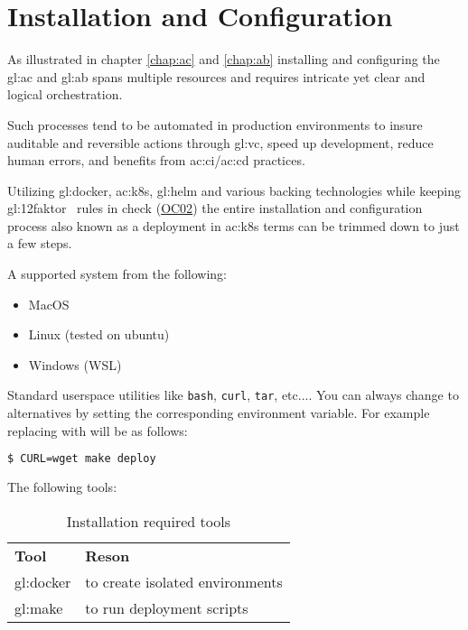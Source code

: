 %
\chapter{Installation and Configuration}

As illustrated in chapter \ref{chap:ac} and \ref{chap:ab} installing and configuring the \gls{gl:ac} and \gls{gl:ab} spans multiple resources and requires intricate yet clear and logical orchestration.

Such processes tend to be automated in production environments to insure auditable and reversible actions through \gls{gl:vc}, speed up development, reduce human errors, and benefits from \gls{ac:ci}/\gls{ac:cd} practices.

Utilizing \gls{gl:docker}, \gls{ac:k8s}, \gls{gl:helm} and various backing technologies while keeping \gls{gl:12faktor}~\citep{TheTwelv47} rules in check (\hyperref[oc:ac02]{OC02}) the entire installation and configuration process also known as a deployment in \gls{ac:k8s} terms can be trimmed down to just a few steps.


A supported system from the following:

\begin{itemize}
  \item MacOS
  \item Linux (tested on ubuntu)
  \item Windows (WSL)
\end{itemize}

Standard userspace utilities like \lstinline[columns=fixed]{bash}, \lstinline[columns=fixed]{curl}, \lstinline[columns=fixed]{tar}, etc.... You can always change to alternatives by setting the corresponding environment variable. For example replacing  with  will be as follows:

\begin{lstlisting}[language=bash, caption={Deploy with custom command}, label={sh:dwcc}]
    $ CURL=wget make deploy
\end{lstlisting}

The following tools:

\begin{table}[H]
  \begin{center}
    \label{tab:irt}
    \def\arraystretch{1.5}
    \begin{tabularx}{\linewidth}{|l X |}
      \hline
      \rowcolor{gray!20}
      \textbf{Tool} & \textbf{Reson}\\
      \gls{gl:docker} & to create isolated environments\\
      \gls{gl:make} & to run deployment scripts\\
      \hline
    \end{tabularx}
    \caption{Installation required tools}
  \end{center}
\end{table}

